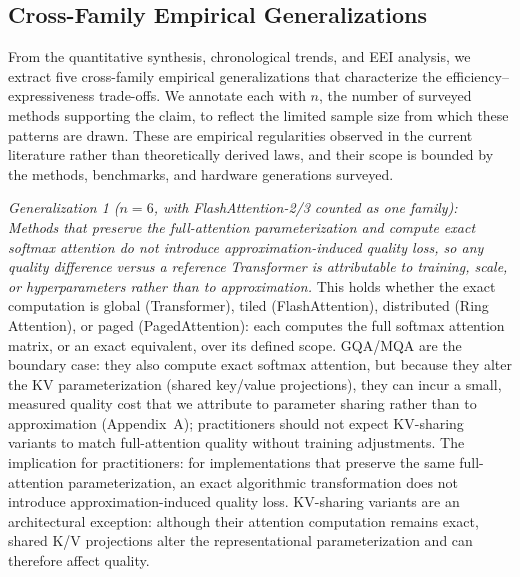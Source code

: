 \documentclass[10pt,twocolumn]{article}
\begin{document}
\subsection*{Cross-Family Empirical Generalizations}

From the quantitative synthesis, chronological trends, and EEI analysis, we extract five cross-family empirical generalizations that characterize the efficiency--expressiveness trade-offs. We annotate each with $n$, the number of surveyed methods supporting the claim, to reflect the limited sample size from which these patterns are drawn. These are empirical regularities observed in the current literature rather than theoretically derived laws, and their scope is bounded by the methods, benchmarks, and hardware generations surveyed.

\textit{Generalization 1 ($n = 6$, with FlashAttention-2/3 counted as one family): Methods that preserve the full-attention parameterization and compute exact softmax attention do not introduce approximation-induced quality loss, so any quality difference versus a reference Transformer is attributable to training, scale, or hyperparameters rather than to approximation.} This holds whether the exact computation is global (Transformer), tiled (FlashAttention), distributed (Ring Attention), or paged (PagedAttention): each computes the full softmax attention matrix, or an exact equivalent, over its defined scope. GQA/MQA are the boundary case: they also compute exact softmax attention, but because they alter the KV parameterization (shared key/value projections), they can incur a small, measured quality cost that we attribute to parameter sharing rather than to approximation (Appendix~A); practitioners should not expect KV-sharing variants to match full-attention quality without training adjustments. The implication for practitioners: for implementations that preserve the same full-attention parameterization, an exact algorithmic transformation does not introduce approximation-induced quality loss. KV-sharing variants are an architectural exception: although their attention computation remains exact, shared K/V projections alter the representational parameterization and can therefore affect quality.
\end{document}
